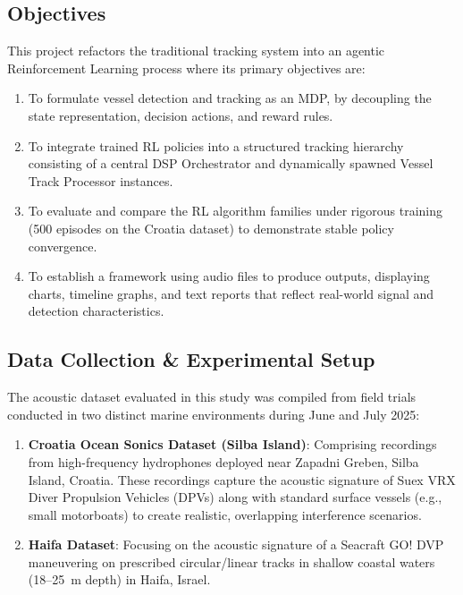 \documentclass[12pt,a4paper]{article}
\begin{document}
\subsection{Objectives}
This project refactors the traditional tracking system into an agentic Reinforcement Learning process where its primary objectives are:
\begin{enumerate}
    \item To formulate vessel detection and tracking as an MDP, by decoupling the state representation, decision actions, and reward rules.
    \item To integrate trained RL policies into a structured tracking hierarchy consisting of a central DSP Orchestrator and dynamically spawned Vessel Track Processor instances.
    \item To evaluate and compare the RL algorithm families under rigorous training (500 episodes on the Croatia dataset) to demonstrate stable policy convergence.
    \item To establish a framework using audio files to produce outputs, displaying charts, timeline graphs, and text reports that reflect real-world signal and detection characteristics.
\end{enumerate}

\subsection{Data Collection \& Experimental Setup}
The acoustic dataset evaluated in this study was compiled from field trials conducted in two distinct marine environments during June and July 2025:
\begin{enumerate}
    \item \textbf{Croatia Ocean Sonics Dataset (Silba Island)}: Comprising recordings from high-frequency hydrophones deployed near Zapadni Greben, Silba Island, Croatia. These recordings capture the acoustic signature of Suex VRX Diver Propulsion Vehicles (DPVs) along with standard surface vessels (e.g., small motorboats) to create realistic, overlapping interference scenarios.
    \item \textbf{Haifa Dataset}: Focusing on the acoustic signature of a Seacraft GO! DVP maneuvering on prescribed circular/linear tracks in shallow coastal waters (18--25~m depth) in Haifa, Israel.
\end{enumerate}
\end{document}
